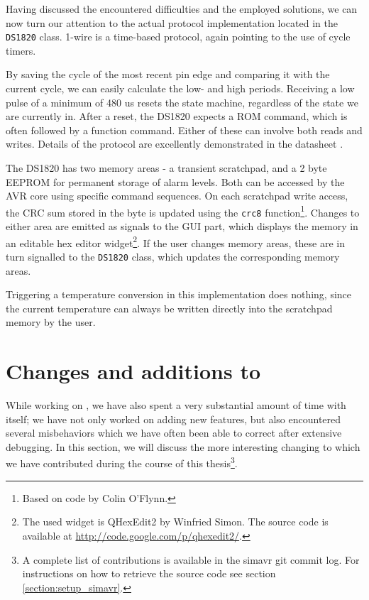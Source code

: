Having discussed the encountered difficulties and the employed solutions, we
can now turn our attention to the actual protocol implementation located in the
\lstinline|DS1820| class. 1-wire is a time-based protocol, again pointing to the
use of cycle timers.

By saving the cycle of the most recent pin edge and comparing
it with the current cycle, we can easily calculate the low- and high periods.
Receiving a low pulse of a minimum of 480 \ac{us} resets the state machine,
regardless of the state we are currently in. After a reset, the DS1820
expects a ROM command, which is often followed by a function command. Either of
these can involve both reads and writes. Details of the protocol are excellently
demonstrated in the datasheet \cite{maxim02}.

The DS1820 has two memory areas - a transient scratchpad, and a 2 byte \ac{EEPROM}
for permanent storage of alarm levels. Both can be accessed by the \ac{AVR} core
using specific command sequences. On each scratchpad write access, the \ac{CRC}
sum stored in the  byte is updated using the \lstinline|crc8| function\footnote{
%
Based on code by Colin O'Flynn.
%
}. Changes to either area are emitted as signals to the \ac{GUI} part, which
displays the memory in an editable hex editor widget\footnote{
%
The used widget is QHexEdit2 by Winfried Simon. The source code is available
at \url{http://code.google.com/p/qhexedit2/}.
%
}. If the user changes memory areas, these are in turn signalled to the
\lstinline|DS1820| class, which updates the corresponding memory areas.

Triggering a temperature conversion in this implementation does nothing, since the
current temperature can always be written directly into the scratchpad memory by the user.

\section{Changes and additions to \simavr}

While working on \qsimavr, we have also spent a very substantial amount of time
with \simavr itself; we have not only worked on adding new features, but also encountered
several misbehaviors which we have often been able to correct after extensive debugging.
In this section, we will discuss the more interesting changing to \simavr which
we have contributed during the course of this thesis\footnote{
%
A complete list of contributions is available in the simavr git commit log. For
instructions on how to retrieve the source code see section \ref{section:setup_simavr}.
%
}.

